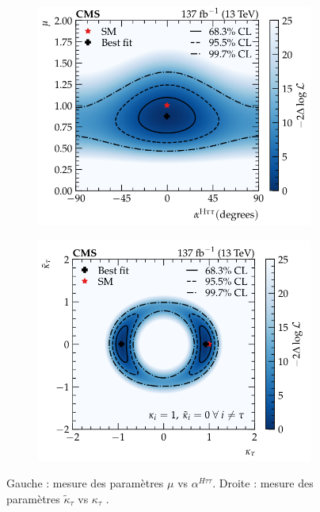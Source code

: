 \begin{figure}
    \begin{subfigure}[b]{0.5\linewidth}
        \centering
        \includegraphics[width=\linewidth]{Chapitre5/Images/AlphaHtt.png}
    \end{subfigure}
    \begin{subfigure}[b]{0.5\linewidth}
        \centering
        \includegraphics[width=\linewidth]{Chapitre5/Images/kappaHtt.png}
    \end{subfigure}
    \caption{Gauche : mesure des paramètres $\mu$ vs $\alpha^{H\tau\tau}$. Droite : mesure des paramètres $\tilde{\kappa}_{\tau}$ vs $\kappa_{\tau}$ \cite{Htautau}.}
    \label{Htautauresults}
\end{figure}

